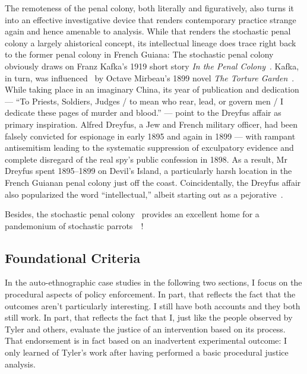 The remoteness of the penal colony, both literally and figuratively, also turns
it into an effective investigative device that renders contemporary practice
strange again and hence amenable to analysis. While that renders the stochastic
penal colony a largely ahistorical concept, its intellectual lineage does trace
right back to the former penal colony in French Guiana: The stochastic penal
colony obviously draws on Franz Kafka's 1919 short story \emph{In the Penal
Colony}~\cite{Kafka1995}. Kafka, in turn, was influenced~\cite{Robertson2017} by
Octave Mirbeau's 1899 novel \emph{The Torture Garden}~\cite{Mirbeau2008}. While
taking place in an imaginary China, its year of publication and dedication ---
``To Priests, Soldiers, Judges / to mean who rear, lead, or govern men / I
dedicate these pages of murder and blood.'' --- point to the Dreyfus affair as
primary inspiration. Alfred Dreyfus, a Jew and French military officer, had been
falsely convicted for espionage in early 1895 and again in 1899 --- with rampant
antisemitism leading to the systematic suppression of exculpatory evidence and
complete disregard of the real spy's public confession in 1898. As a result, Mr
Dreyfus spent 1895--1899 on Devil's Island, a particularly harsh location in the
French Guianan penal colony just off the coast. Coincidentally, the Dreyfus
affair also popularized the word ``intellectual,'' albeit starting out as a
pejorative~\cite{Drake2005,StudentsAtTheUniversityOfBristol2021}.

Besides, the stochastic penal colony~ provides an excellent
home for a pandemonium of stochastic
parrots~~\cite{BenderGebruea2021}!


\subsection{Foundational Criteria}
\label{sec:criteria}

In the auto-ethnographic case studies in the following two sections, I focus on
the procedural aspects of policy enforcement. In part, that reflects the fact
that the outcomes aren't particularly interesting. I still have both accounts
and they both still work. In part, that reflects the fact that I, just like the
people observed by Tyler and others, evaluate the justice of an intervention
based on its process. That endorsement is in fact based on an inadvertent
experimental outcome: I only learned of Tyler's work after having performed a
basic procedural justice analysis.

